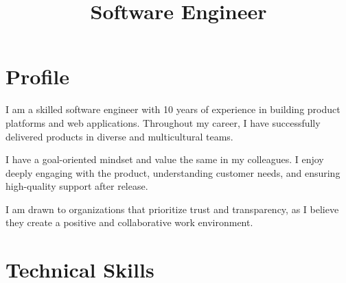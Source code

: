 \documentclass[11pt,a4paper,sans]{moderncv}
\title{Software Engineer}
\begin{document}
\makecvtitle

\section{Profile}
\setlength{\parindent}{15pt} I am a skilled software engineer with 10 years of experience in building product platforms and web applications.
Throughout my career, I have successfully delivered products in diverse and multicultural teams.

I have a goal-oriented mindset and value the same in my colleagues.
I enjoy deeply engaging with the product, understanding customer needs, and ensuring high-quality support after release.

I am drawn to organizations that prioritize trust and transparency, as I believe they create a positive and collaborative work environment.

\section{Technical Skills}
\end{document}
